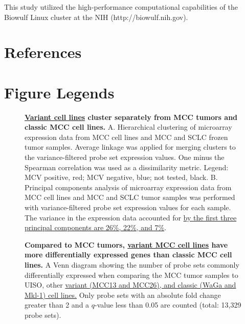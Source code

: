 \documentclass[10pt]{article}
\begin{document}
This study utilized the high-performance computational capabilities of the Biowulf Linux cluster at the NIH (http://biowulf.nih.gov).

\section*{References}
\begin{singlespace}

\end{singlespace}

\newpage

\section*{Figure Legends}

\begin{figure}[!ht]
  \begin{center}
  \end{center}
  
  \caption{
    {\bf \uline{Variant cell lines} cluster separately from MCC tumors and classic MCC cell lines.}
    A. Hierarchical clustering of microarray expression data from MCC cell lines and MCC and SCLC frozen tumor samples.
    Average linkage was applied for merging clusters to the variance-filtered probe set expression values.
    One minus the Spearman correlation was used as a dissimilarity metric.
    Legend: MCV positive, red; MCV negative, blue; not tested, black.
    B. Principal components analysis of microarray expression data from MCC cell lines and MCC and SCLC tumor samples was performed with variance-filtered probe set expression values for each sample.
    The variance in the expression data accounted for \uline{by the first three principal components are 26\%, 22\%, and 7\%}.}
  
  \label{fig:clustering}

\end{figure}

\begin{figure}[!ht]

  \begin{center}
  \end{center}

  \caption{
    {\bf Compared to MCC tumors, \uline{variant MCC cell lines} have more differentially expressed genes than classic MCC cell lines.}
    A Venn diagram showing the number of probe sets commonly differentially expressed when comparing the MCC tumor samples to UISO, other \uline{variant (MCC13 and MCC26), and classic (WaGa and Mkl-1) cell lines.}
    Only probe sets with an absolute fold change greater than 2 and a $q$-value less than 0.05 are counted (total: 13,329 probe sets).}

  \label{fig:venn}
\end{figure}
\end{document}

